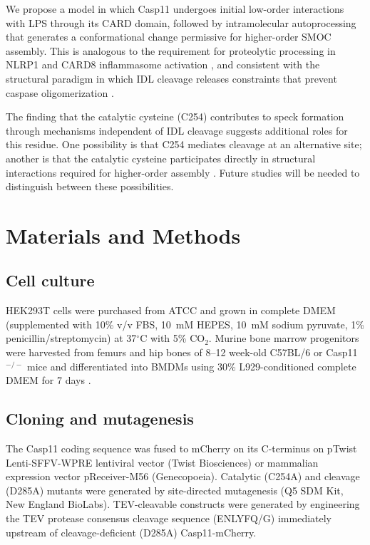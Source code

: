 \documentclass[11pt]{article}
\begin{document}
We propose a model in which Casp11 undergoes initial low-order interactions with LPS through its CARD domain, followed by intramolecular autoprocessing that generates a conformational change permissive for higher-order SMOC assembly. This is analogous to the requirement for proteolytic processing in NLRP1 and CARD8 inflammasome activation \citep{chavarria2016,sharif2021}, and consistent with the structural paradigm in which IDL cleavage releases constraints that prevent caspase oligomerization \citep{boatright2003,shang2021}.

The finding that the catalytic cysteine (C254) contributes to speck formation through mechanisms independent of IDL cleavage suggests additional roles for this residue. One possibility is that C254 mediates cleavage at an alternative site; another is that the catalytic cysteine participates directly in structural interactions required for higher-order assembly \citep{boucher2018}. Future studies will be needed to distinguish between these possibilities.

\section{Materials and Methods}

\subsection{Cell culture}
HEK293T cells were purchased from ATCC and grown in complete DMEM (supplemented with 10\% v/v FBS, 10~mM HEPES, 10~mM sodium pyruvate, 1\% penicillin/streptomycin) at 37$^\circ$C with 5\% CO$_2$. Murine bone marrow progenitors were harvested from femurs and hip bones of 8--12 week-old C57BL/6 or Casp11$^{-/-}$ mice and differentiated into BMDMs using 30\% L929-conditioned complete DMEM for 7 days \citep{bjanes2021}.

\subsection{Cloning and mutagenesis}
The Casp11 coding sequence was fused to mCherry on its C-terminus on pTwist Lenti-SFFV-WPRE lentiviral vector (Twist Biosciences) or mammalian expression vector pReceiver-M56 (Genecopoeia). Catalytic (C254A) and cleavage (D285A) mutants were generated by site-directed mutagenesis (Q5 SDM Kit, New England BioLabs). TEV-cleavable constructs were generated by engineering the TEV protease consensus cleavage sequence (ENLYFQ/G) immediately upstream of cleavage-deficient (D285A) Casp11-mCherry.
\end{document}
